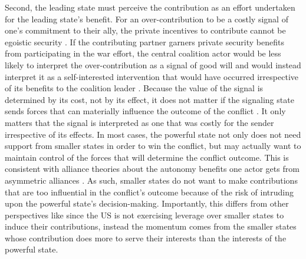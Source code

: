 \documentclass[12pt,letterpaper]{article}
\begin{document}
		Second, the leading state must perceive the contribution as an effort undertaken for the leading state's benefit. For an over-contribution to be a costly signal of one's commitment to their ally, the private incentives to contribute cannot be egoistic security \citep{davidson_americaallieswar_2011}. If the contributing partner garners private security benefits from participating in the war effort, the central coalition actor would be less likely to interpret the over-contribution as a signal of good will and would instead interpret it as a self-interested intervention that would have occurred irrespective of its benefits to the coalition leader \citep{tago_whystatesjoin_2007, lake_hierarchyinternationalrelations_2009, chapman_securingapprovaldomestic_2011}. Because the value of the signal is determined by its cost, not by its effect, it does not matter if the signaling state sends forces that can materially influence the outcome of the conflict \citep{davidson_americaallieswar_2011}. It only matters that the signal is interpreted as one that was costly for the sender irrespective of its effects. In most cases, the powerful state not only does not need support from smaller states in order to win the conflict, but may actually want to maintain control of the forces that will determine the conflict outcome. This is consistent with alliance theories about the autonomy benefits one actor gets from asymmetric alliances \citep{morrow_alliancesasymmetryalternative_1991}. As such, smaller states do not want to make contributions that are too influential in the conflict's outcome because of the risk of intruding upon the powerful state's decision-making. Importantly, this differs from other perspectives like \citet[72-75]{bennett_burdensharingpersiangulf_1994} since the US is not exercising leverage over smaller states to induce their contributions, instead the momentum comes from the smaller states whose contribution does more to serve their interests than the interests of the powerful state.
\end{document}
